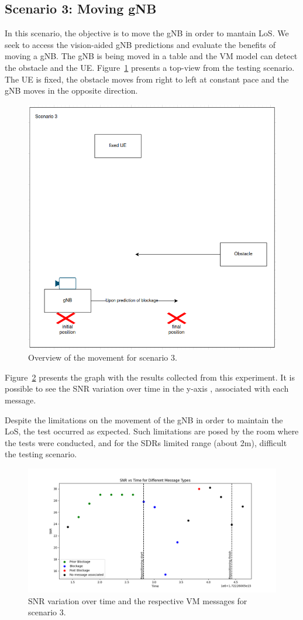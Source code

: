 \subsection{Scenario 3: Moving gNB}\label{subsec:scenario-3:-moving-gnb}

In this scenario, the objective is to move the gNB in order to mantain LoS\@.
We seek to access the vision-aided gNB predictions and evaluate the benefits of moving a gNB\@.
The gNB is being moved in a table and the VM model can detect the obstacle and the UE\@.
Figure~\ref{fig:test_movgnb} presents a top-view from the testing scenario.
The UE  is fixed, the obstacle moves from right to left at constant pace and the gNB moves in the opposite direction.

\begin{figure}[H]
    \centering
    \includegraphics[width=0.5\linewidth]{figures/scenario3}
    \caption{Overview of the movement for scenario 3.}
    \label{fig:test_movgnb}
\end{figure}

Figure~\ref{fig:results_3} presents the graph with the results collected from this experiment.
It is possible to see the SNR variation over time in the y-axis , associated with each message.

Despite the limitations on the movement of the gNB in order to maintain the LoS, the test occurred as expected.
Such limitations are posed by the room where the tests were conducted, and for the SDRs limited range (about 2m), difficult the testing scenario.


\begin{figure}[H]
    \centering
    \includegraphics[width=\linewidth]{figures/results_3}
    \caption{SNR variation over time and the respective VM messages for scenario 3.}
    \label{fig:results_3}
\end{figure}

